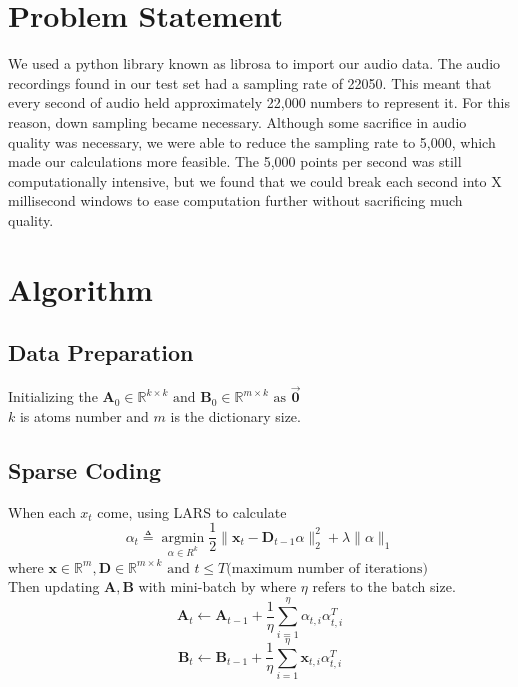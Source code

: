 \documentclass[UTF8]{article}
\begin{document}
\section{Problem Statement}
We used a python library known as librosa\cite{mcfee2015librosa} to import our audio data. The audio recordings found in our test set had a sampling rate of 22050. This meant that every second of audio held approximately 22,000 numbers to represent it. For this reason, down sampling became necessary. Although some sacrifice in audio quality was necessary, we were able to reduce the sampling rate to 5,000, which made our calculations more feasible. The 5,000 points per second was still computationally intensive, but we found that we could break each second into X millisecond windows to ease computation further without sacrificing much quality.


\section{Algorithm}

\subsection{Data Preparation}

Initializing the $\bm{A}_0 \in \mathbb{R}^{k \times k} \text{ and } \bm{B}_0 \in \mathbb{R}^{m \times k} \text{ as } \vec{\bm{0}} $\\
$k$ is atoms number and $m$ is the dictionary size.

\subsection{Sparse Coding}
When each $x_t$ come, using LARS\cite{scikit-learn} to calculate
\[
	\alpha_t \triangleq \mathop{\arg\min}\limits_{\alpha\in R^k} \frac{1}{2} \| \bm{x}_t - \bm{D}_{t-1} \alpha  \|^2_2 + \lambda \|\alpha\|_1
\]
where $\bm{x} \in \mathbb{R}^{m}, \bm{D} \in \mathbb{R}^{m \times k} \text{ and } t \leq T \text{(maximum number of iterations)}$
\\
Then updating $\bm{A}, \bm{B}$ with mini-batch by where $\eta$ refers to the batch size.
\[\bm{A}_t \leftarrow \bm{A}_{t-1} + \frac{1}{\eta}\sum\limits_{i=1}^{\eta}\alpha_{t,i} \alpha_{t,i}^T\]
\[\bm{B}_t \leftarrow \bm{B}_{t-1} + \frac{1}{\eta}\sum\limits_{i=1}^{\eta}\bm{x}_{t,i} \alpha_{t,i}^T\]
\end{document}
